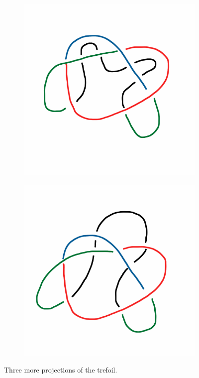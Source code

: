 \documentclass[12pt,letterpaper]{article}
\theoremstyle{definition}
\begin{document}
\begin{figure}[h]
\begin{subfigure}{.3\textwidth}
        \includegraphics[width=\textwidth]{knotpics/tricolor3.png}
    \end{subfigure}
    \quad
    \begin{subfigure}{.3\textwidth}
        \centering
        \includegraphics[width=\textwidth]{knotpics/tricolor4.png}
    \end{subfigure}
    \caption{Three more projections of the trefoil.}
\end{figure}
\end{document}
